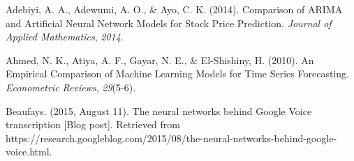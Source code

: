 \documentclass[11pt, oneside]{article}
\begin{document}
\begin{thebibliography}{9}








  Adebiyi, A. A., Adewumi, A. O., \& Ayo, C. K. (2014). Comparison of ARIMA and Artificial Neural Network Models for Stock Price Prediction. \textit{Journal of Applied Mathematics}, \textit{2014}.

  Ahmed, N. K., Atiya, A. F., Gayar, N. E., \& El-Shishiny, H. (2010). An Empirical Comparison of Machine Learning Models for Time Series Forecasting. \textit{Econometric Reviews}, \textit{29}(5-6).

  Beaufays. (2015, August 11). The neural networks behind Google Voice transcription [Blog post]. Retrieved from https://research.googleblog.com/2015/08/the-neural-networks-behind-google-voice.html.

\end{thebibliography}
\end{document}
